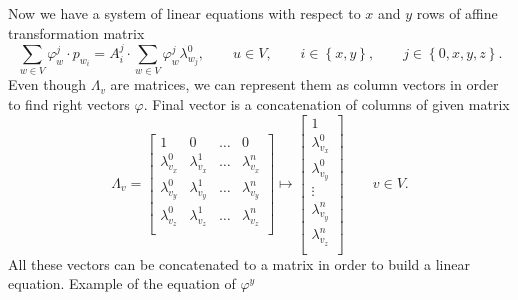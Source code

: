 Now we have a system of linear equations
with respect to $x$ and $y$ rows of affine transformation matrix
\begin{equation*}
  \sum\limits_{w \in V} \varphi_w^j \cdot p_{w_i}
  = A_i^j \cdot \sum\limits_{w \in V} \varphi_w^j \lambda^0_{w_j},
  \qquad u \in V,
  \qquad i \in \left\{ x, y \right\},
  \qquad j \in \left\{ 0, x, y, z \right\}.
\end{equation*}
Even though $\Lambda_v$ are matrices,
we can represent them as column vectors
in order to find right vectors $\varphi$.
Final vector is a concatenation of columns of given matrix
\begin{equation*}
  \Lambda_v = \begin{bmatrix}
    1               & 0               & \dots & 0 \\
    \lambda^0_{v_x} & \lambda^1_{v_x} & \dots & \lambda^n_{v_x} \\
    \lambda^0_{v_y} & \lambda^1_{v_y} & \dots & \lambda^n_{v_y} \\
    \lambda^0_{v_z} & \lambda^1_{v_z} & \dots & \lambda^n_{v_z} \\
  \end{bmatrix}
  \mapsto
  \begin{bmatrix}
    1 \\
    \lambda^0_{v_x} \\
    \lambda^0_{v_y} \\
    \vdots \\
    \lambda^n_{v_y} \\
    \lambda^n_{v_z} \\
  \end{bmatrix}
  \qquad v \in V.
\end{equation*}
All these vectors can be concatenated to a matrix
in order to build a linear equation.
Example of the equation of $\varphi^y$
